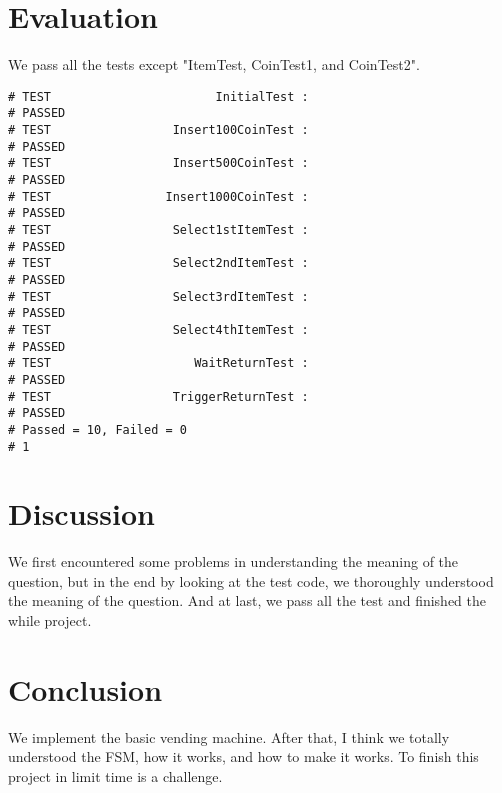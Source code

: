 \documentclass[12pt,a4paper]{article}
\begin{document}
\newpage

\section{Evaluation}

We pass all the tests except "ItemTest, CoinTest1, and CoinTest2".

\lstset{language=Verilog}
\begin{lstlisting}
# TEST                       InitialTest :
# PASSED
# TEST                 Insert100CoinTest :
# PASSED
# TEST                 Insert500CoinTest :
# PASSED
# TEST                Insert1000CoinTest :
# PASSED
# TEST                 Select1stItemTest :
# PASSED
# TEST                 Select2ndItemTest :
# PASSED
# TEST                 Select3rdItemTest :
# PASSED
# TEST                 Select4thItemTest :
# PASSED
# TEST                    WaitReturnTest :
# PASSED
# TEST                 TriggerReturnTest :
# PASSED
# Passed = 10, Failed = 0
# 1
\end{lstlisting}

\newpage
\section{Discussion}

We first encountered some problems in understanding the meaning of the question, 
but in the end by looking at the test code, 
we thoroughly understood the meaning of the question.
And at last, we pass all the test and finished the while project.

\section{Conclusion}

We implement the basic vending machine.
After that, I think we totally understood the FSM, how it works, and how to make it works.
To finish this project in limit time is a challenge.
\end{document}
